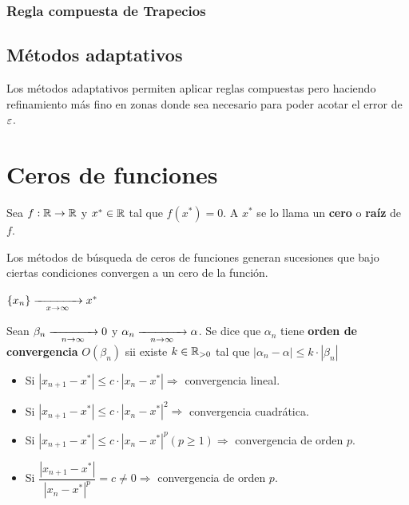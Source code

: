 \documentclass[]{article}
\begin{document}
\subsubsection{Regla compuesta de Trapecios}

\subsection{Métodos adaptativos}
Los métodos adaptativos permiten aplicar reglas compuestas pero haciendo refinamiento más fino en zonas donde sea necesario para poder acotar el error de $\varepsilon$.


\section{Ceros de funciones}
\begin{defi}
	Sea $f:\mathbb{R}\to\mathbb{R}$ y $x^*\in\mathbb{R}$ tal que $f(x^*) = 0$. A $x^*$ se lo llama un \textbf{cero} o \textbf{raíz} de $f$.
\end{defi}

Los métodos de búsqueda de ceros de funciones generan sucesiones que bajo ciertas condiciones convergen a un cero de la función.
\begin{center}
	$\{x_n\}\xrightarrow[\hspace*{0.3cm} x\to\infty \hspace*{0.3cm}]{}x^*$
\end{center}

\begin{defi}
	Sean $\beta_n \xrightarrow[\hspace*{0.3cm} n\to\infty \hspace*{0.3cm}]{}0$ y $\alpha_n\xrightarrow[\hspace*{0.3cm} n\to\infty \hspace*{0.3cm}]{}\alpha$. Se dice que $\alpha_n$ tiene \textbf{orden de convergencia} $O(\beta_n)$ sii existe $k\in\mathbb{R}_{>0}$ tal que $|\alpha_n - \alpha| \leq k\cdot |\beta_n|$

	\begin{itemize}
		\item Si $|x_{n+1}-x^*| \leq c\cdot|x_n - x^*| \Rightarrow$ convergencia lineal.
		\item Si $|x_{n+1}-x^*| \leq c\cdot|x_n - x^*|^2 \Rightarrow$ convergencia cuadrática.
		\item Si $|x_{n+1}-x^*| \leq c\cdot|x_n - x^*|^p (p\geq 1)\Rightarrow$ convergencia de orden $p$.
		\item Si $\dfrac{|x_{n+1}-x^*|}{|x_n - x^*|^p} = c \neq 0 \Rightarrow$ convergencia de orden $p$.
	\end{itemize}
\end{defi}
\end{document}

